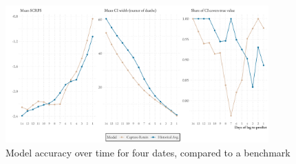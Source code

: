 \begin{figure}[h]
    \centering
    \includegraphics[width=0.9\textwidth]{../plots/model_metrics}
    \caption{Model accuracy over time for four dates, compared to a benchmark}
    \label{fig:model_metrics}
\end{figure}